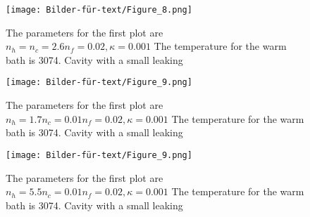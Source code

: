 \documentclass[12pt,a4paper]{article}
\begin{document}
\begin{figure}[hbtp]
\centering
\texttt{[image: Bilder-für-text/Figure\_8.png]}
\caption{The parameters for the first plot are $ n_h=n_c=2.6 n_f=0.02,\kappa=0.001$ The temperature for the warm bath is 3074. Cavity with a small leaking}
\end{figure}

\begin{figure}[hbtp]
\centering
\texttt{[image: Bilder-für-text/Figure\_9.png]}
\caption{The parameters for the first plot are $ n_h=1.7 n_c=0.01 n_f=0.02,\kappa=0.001$ The temperature for the warm bath is 3074. Cavity with a small leaking}
\end{figure}
\begin{figure}[hbtp]
\centering
\texttt{[image: Bilder-für-text/Figure\_9.png]}
\caption{The parameters for the first plot are $ n_h=5.5 n_c=0.01 n_f=0.02,\kappa=0.001$ The temperature for the warm bath is 3074. Cavity with a small leaking}
\end{figure}
\end{document}

